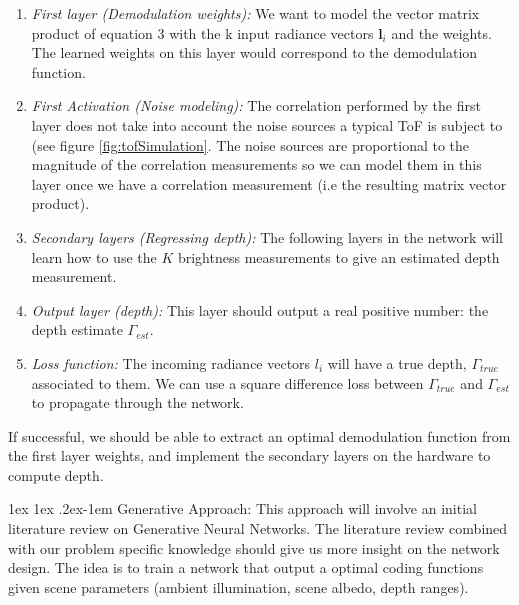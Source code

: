 \documentclass[11pt]{article}
\makeatletter
\def \l {\mathbf{l}}
\renewcommand{\paragraph}{%
  \@startsection{paragraph}{4}%
  {\z@}{1ex \@plus 1ex \@minus .2ex}{-1em}%
  {\normalfont\normalsize\bfseries}%
}
\makeatother
\begin{document}
\begin{enumerate}
	\item \textit{First layer (Demodulation weights):} We want to model the vector matrix product of equation 3 with the k input radiance vectors $\l_i$ and the weights. The learned weights on this layer would correspond to the demodulation function.
	\item \textit{First Activation (Noise modeling):} The correlation performed by the first layer does not take into account the noise sources a typical ToF is subject to (see figure \ref{fig:tofSimulation}. The noise sources are proportional to the magnitude of the correlation measurements so we can model them in this layer once we have a correlation measurement (i.e the resulting matrix vector product).
	\item \textit{Secondary layers (Regressing depth):} The following layers in the network will learn how to use the $K$ brightness measurements to give an estimated depth measurement.
	\item \textit{Output layer (depth):} This layer should output a real positive number: the depth estimate $\Gamma_{est}$.
	\item \textit{Loss function:} The incoming radiance vectors $l_i$ will have a true depth, $\Gamma_{true}$ associated to them. We can use a square difference loss between $\Gamma_{true}$ and $\Gamma_{est}$ to propagate through the network.
\end{enumerate}

If successful, we should be able to extract an optimal demodulation function from the first layer weights, and implement the secondary layers on the hardware to compute depth.

\paragraph{Generative Approach:} This approach will involve an initial literature review on Generative Neural Networks. The literature review combined with our problem specific knowledge should give us more insight on the network design. The idea is to train a network that output a optimal coding functions given scene parameters (ambient illumination, scene albedo, depth ranges).   
\end{document}
